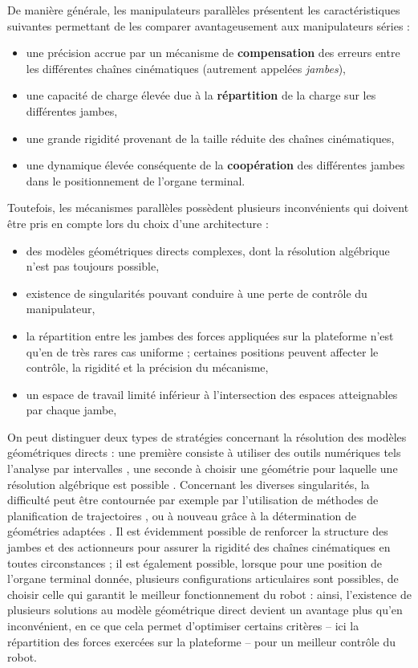 De manière générale, les manipulateurs parallèles présentent les caractéristi\-ques sui\-vantes permettant de les comparer avantageusement aux manipulateurs séries :
\begin{itemize}
 \item une précision accrue par un mécanisme de {\bf compensation} des erreurs entre les différentes chaînes cinématiques (autrement appelées {\it jambes}),
 \item une capacité de charge élevée due à la {\bf répartition} de la charge sur les différentes jambes,
 \item une grande rigidité provenant de la taille réduite des chaînes cinématiques,
 \item une dynamique élevée conséquente de la {\bf coopération} des différentes jambes dans le positionnement de l'organe terminal.
\end{itemize}

Toutefois, les mécanismes parallèles possèdent plusieurs inconvénients qui doivent être pris en compte lors du choix d'une architecture :
\begin{itemize}
 \item des modèles géométriques directs complexes, dont la résolution algébrique n'est pas toujours possible,
 \item existence de singularités pouvant conduire à une perte de contrôle du manipulateur,
 \item la répartition entre les jambes des forces appliquées sur la plateforme n'est qu'en de très rares cas uniforme ; certaines positions peuvent affecter le contrôle, la rigidité et la précision du mécanisme,
 \item un espace de travail limité inférieur à l'intersection des espaces atteignables par chaque jambe,
\end{itemize}

On peut distinguer deux types de stratégies concernant la résolution des modèles géométriques directs : une première consiste à utiliser des outils numé\-riques tels l'analyse par intervalles \cite{Merlet04solvingthe}, une seconde à choisir une géométrie pour laquelle une résolution algébrique est possible \cite{2003:Krut1}. Concernant les diverses singularités, la difficulté peut être contournée par exemple par l'utilisation de méthodes de planification de trajectoires \cite{2008:Chen.Chi}, \cite{1998:Dasgupta.Mruthyunjaya} ou à nouveau grâce à la détermination de géométries adaptées \cite{w1994:DiCaprioStanisic}. Il est évidemment possible de renforcer la structure des jambes et des actionneurs pour assurer la rigidité des chaînes cinématiques en toutes circonstances ; il est également possible, lorsque pour une position de l'organe terminal donnée, plusieurs configurations articulaires sont possibles, de choisir celle qui garantit le meilleur fonctionnement du robot \cite{2002:Verhoeven.Miller} : ainsi, l'existence de plusieurs solutions au modèle géométrique direct devient un avantage plus qu'en inconvénient, en ce que cela permet d'optimiser certains critères -- ici la répartition des forces exercées sur la plateforme -- pour un meilleur contrôle du robot.

